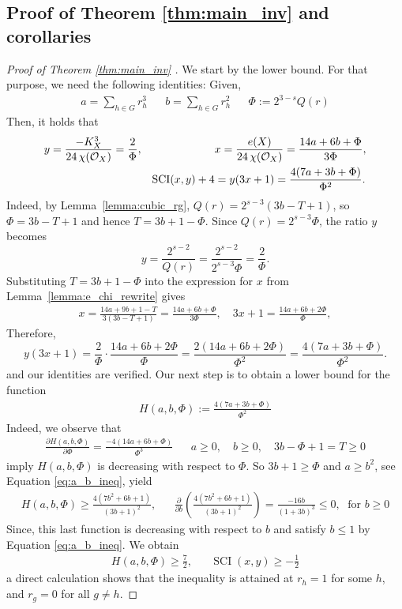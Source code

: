 \documentclass[12pt,twoside,]{amsart}
\theoremstyle{plain}
\theoremstyle{definition}
\begin{document}
\subsection{Proof of Theorem \ref{thm:main_inv} and corollaries}
\label{sec:proof_thm_inv}
\begin{proof}[Proof of Theorem \ref{thm:main_inv} ]
We start by the lower bound. For that purpose, we need the following identities:
Given, 
\begin{align*}
 a = \sum_{h \in G} r_h^3
 &&
 b = \sum_{h \in G} r_h^2
 &&
 \Phi := 2^{3-s}Q(r)
\end{align*}
Then, it holds that
\begin{align}\label{eq:exp_proof}
y &= \frac{-K_X^3}{24\,\chi(\mathcal{O}_X)}
=
\frac{2}{\Phi}, 
&&
x =  \frac{e(X)}{24\,\chi(\mathcal{O}_X)}
= \frac{14a + 6b + \Phi}{3\Phi},    
\\
&&
\operatorname{SCI}(x,y)+4 &= 
y(3x+1) = \frac{4(7a + 3b + \Phi)}{\Phi^2}.
\notag
\end{align}
Indeed, by Lemma~\ref{lemma:cubic_rg}, $Q(r) = 2^{s-3}(3b - T + 1)$, so $\Phi = 3b - T + 1$ and hence $T = 3b + 1 - \Phi$. Since $Q(r) = 2^{s-3}\Phi$, the ratio $y$ becomes
\[
y = \frac{2^{s-2}}{Q(r)} = \frac{2^{s-2}}{2^{s-3}\Phi} = \frac{2}{\Phi}.
\]
Substituting $T = 3b + 1 - \Phi$ into the expression for $x$ from Lemma~\ref{lemma:e_chi_rewrite} gives
\begin{align*}
x = \frac{14a + 9b + 1 - T}{3(3b - T + 1)} = \frac{14a + 6b + \Phi}{3\Phi}, 
\quad 
3x + 1 =  \frac{14a + 6b + 2\Phi}{\Phi},
\end{align*}
Therefore,
\[
y(3x+1) =  
\frac{2}{\Phi} \cdot \frac{14a + 6b + 2\Phi}{\Phi} = \frac{2(14a + 6b + 2\Phi)}{\Phi^2} = \frac{4(7a + 3b + \Phi )}{\Phi^2}.
\]
and our identities  are verified. 
Our next step is to obtain a lower bound for the function
\begin{align*}
 H(a,b,\Phi)  := 
 \frac{4(7a + 3b + \Phi )}{\Phi^2} 
\end{align*}
Indeed, we observe that
\begin{align}\label{eq:partial_H}
\frac{\partial H(a,b, \Phi)}{ \partial \Phi}
=
\frac{-4 ( 14 a + 6 b + \Phi )}{\Phi^3}
&&
a \geq 0, \quad b \geq 0, \quad 3b- \Phi +1 = T \geq  0
\end{align}
imply $H(a,b,\Phi)$ is decreasing with respect to $\Phi$. So $3b + 1 \geq \Phi$ and $a \geq b^2$, see Equation \eqref{eq:a_b_ineq}, yield
\begin{align*}
 H(a,b,\Phi)  
 \geq 
  \frac{4(7b^2 + 6b + 1 )}{(3b+1)^2},
  &&
  \frac{\partial }{\partial b}\left(
\frac{4(7b^2 + 6b + 1 )}{(3b+1)^2}  
  \right)
  = 
  \frac{-16b}{(1 + 3 b)^3} \leq 0, \; \text{ for } b \geq 0
\end{align*}
Since, this last function is decreasing with respect to $b$ and satisfy $b \leq 1$ by Equation \eqref{eq:a_b_ineq}. We obtain
\begin{align*}
  H(a,b,\Phi)  \geq \frac{7}{2}, 
  &&
\operatorname{SCI}(x,y) \geq  -\frac{1}{2}
\end{align*}
a direct calculation shows that the inequality is attained at $r_{h} =1$ for some $h$, and $r_g =0$ for all $g \neq h$. 


\end{proof}
\end{document}
